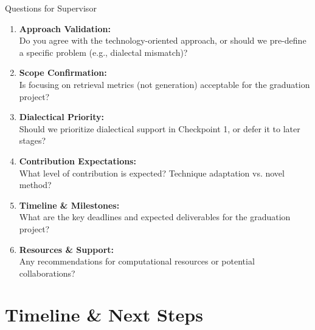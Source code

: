 \documentclass[aspectratio=169]{beamer}
\begin{document}
\begin{frame}{Questions for Supervisor}
\begin{enumerate}
    \item \textbf{Approach Validation:}\\
    Do you agree with the technology-oriented approach, or should we pre-define a specific problem (e.g., dialectal mismatch)?
    
    \vspace{0.3cm}
    
    \item \textbf{Scope Confirmation:}\\
    Is focusing on retrieval metrics (not generation) acceptable for the graduation project?
    
    \vspace{0.3cm}
    
    \item \textbf{Dialectical Priority:}\\
    Should we prioritize dialectical support in Checkpoint 1, or defer it to later stages?
    
    \vspace{0.3cm}
    
    \item \textbf{Contribution Expectations:}\\
    What level of contribution is expected? Technique adaptation vs. novel method?
    
    \vspace{0.3cm}
    
    \item \textbf{Timeline \& Milestones:}\\
    What are the key deadlines and expected deliverables for the graduation project?
    
    \vspace{0.3cm}
    
    \item \textbf{Resources \& Support:}\\
    Any recommendations for computational resources or potential collaborations?
\end{enumerate}
\end{frame}

\section{Timeline \& Next Steps}
\end{document}
